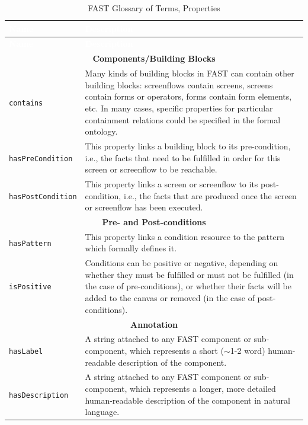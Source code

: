 \documentclass[twoside]{fast_latex}
\begin{document}
\singlespacing
\begin{small}
\begin{longtable}{|p{3.25cm}|p{11cm}|}
\caption{\label{tab:glossary_of_terms_properties}FAST Glossary of Terms, Properties}\\
\hline
\rowcolor{fast@lightgrey}\textcolor{white}{\textbf{Name}} & 
	\textcolor{white}{\textbf{Description}} \\ \hline
\endfirsthead
\rowcolor{fast@lightgrey}\textcolor{white}{\textbf{Name}} & 
	\textcolor{white}{\textbf{Description}} \\ \hline
\endhead
\multicolumn{2}{|c|}{\textbf{Components/Building Blocks}} \\ \hline
\texttt{contains} & Many kinds of building blocks in FAST can contain other building blocks: screenflows contain screens, screens contain forms or operators, forms contain form elements, etc. In many cases, specific properties for particular containment relations could be specified in the formal ontology.  \\ \hline
\texttt{hasPreCondition} & This property links a building block to its pre-condition, i.e., the facts that need to be fulfilled in order for this screen or screenflow to be reachable. \\ \hline
\texttt{hasPostCondition} & This property links a screen or screenflow to its post-condition, i.e., the facts that are produced once the screen or screenflow has been executed. \\ \hline
\multicolumn{2}{|c|}{\textbf{Pre- and Post-conditions}} \\ \hline
\texttt{hasPattern} & This property links a condition resource to the pattern which formally defines it. \\ \hline
\texttt{isPositive} & Conditions can be positive or negative, depending on whether they must be fulfilled or must not be fulfilled (in the case of pre-conditions), or whether their facts will be added to the canvas or removed (in the case of post-conditions). \\ \hline
\multicolumn{2}{|c|}{\textbf{Annotation}} \\ \hline
\texttt{hasLabel} & A string attached to any FAST component or sub-component, which represents a short ($\sim$1-2 word) human-readable description of the component. \\ \hline
\texttt{hasDescription} & A string attached to any FAST component or sub-component, which represents a longer, more detailed human-readable description of the component in natural language. \\ \hline

\end{longtable}
\end{small}
\end{document}
